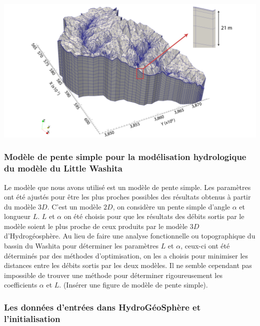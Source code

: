 \documentclass[a4paper,11pt]{article}
\begin{document}
  
\begin{center}
	\captionsetup{type=figure}
	\includegraphics[scale=0.2]{images/little_washita3D.png}
\end{center}


\subsubsection{Modèle de pente simple pour la modélisation hydrologique du modèle du Little Washita}

Le modèle que nous avons utilisé est un modèle de pente simple. Les paramètres ont été ajustés pour être les plus proches possibles des résultats obtenus à partir du modèle $3D$. C'est un modèle $2D$, on considère un pente simple d'angle $\alpha$ et longueur $L$. $L$ et $\alpha$ on été choisis pour que les résultats des débits sortis par le modèle soient le plus proche de ceux produits par le modèle $3D$ d'Hydrogéosphère. Au lieu de faire une analyse fonctionnelle ou topographique du bassin du Washita pour déterminer les paramètres $L$ et $\alpha$, ceux-ci ont été déterminés par des méthodes d'optimisation, on les a choisis pour minimiser les distances entre les débits sortis par les deux modèles. Il ne semble cependant pas impossible de trouver une méthode pour déterminer rigoureusement les coefficients $\alpha$ et $L$. (Insérer une figure de modèle de pente simple).     

\subsubsection{Les données d'entrées dans HydroGéoSphère et l'initialisation}
\end{document}
